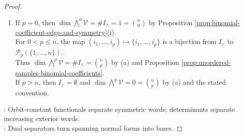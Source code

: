 \begin{theorem}
\begin{proof}
\begin{enumerate}[label=(\roman*)]
\begin{enumerate}[label=(\alph*)]
Repeated basis words lie in $R_{\wedge,p}$ by definition, and every other basis word is congruent up to sign to an increasing word; hence $B_{\wedge}$ spans. Let $E'=(\varepsilon_1,\ldots,\varepsilon_n)$ be the dual basis. For $I=(i_1,\ldots,i_p)\in I_{\wedge}$, set $a_I(\mathbf{v}_1,\ldots,\mathbf{v}_p)\defeq\det[\varepsilon_{i_r}(\mathbf{v}_s)]_{r,s=1}^{p}$.\\
The form $a_I$ is alternating by Theorem \ref{thm:determinant-basic-laws}(ii)--(iv). Thus $(\exists!\,\ell_I\in(\bigwedge^{p}\mathcal{V})')\,a_I=\ell_I\circ q_{\wedge,p}\circ t_p$ by Theorem \ref{thm:symmetric-exterior-universal-properties}(ii).\\
For $I,J\in I_{\wedge}$, $\ell_I(\mathbf{e}_{J}^{\wedge})=\delta_{I,J}$; hence $B_{\wedge}$ is linearly independent and therefore a basis.
\item If $p=0$, then $\dim\bigwedge^{0}\mathcal{V}=\#I_{\wedge}=1=\binom{n}{0}$ by Proposition \ref{prop:binomial-coefficient-edge-and-symmetry}(i).\\
For $0<p\leq n$, the map $(i_1,\ldots,i_p)\mapsto\{i_1,\ldots,i_p\}$ is a bijection from $I_{\wedge}$ to $\mathcal{P}_p(\{1,\ldots,n\})$.\\
Thus $\dim\bigwedge^{p}\mathcal{V}=\#I_{\wedge}=\binom{n}{p}$ by (a) and Proposition \ref{prop:unordered-samples-binomial-coefficients}.\\
If $p>n$, then $I_{\wedge}=\emptyset$ and $\dim\bigwedge^{p}\mathcal{V}=0=\binom{n}{p}$ by (a) and the stated convention.
\end{enumerate}
\end{enumerate}
: Orbit-constant functionals separate symmetric words; determinants separate increasing exterior words.\\
: Dual separators turn spanning normal forms into bases.
\end{proof}
\end{theorem}

